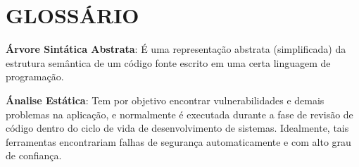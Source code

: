 



\chapter*{GLOSSÁRIO}

{ \setlength{\parindent}{0pt} %

\textbf{Árvore Sintática Abstrata}: É uma representação abstrata (simplificada) da estrutura semântica de um código fonte escrito em uma certa linguagem de programação.

\textbf{Ánalise Estática}: Tem por objetivo encontrar vulnerabilidades e demais problemas na aplicação, e normalmente é executada durante a fase de revisão de código dentro do ciclo de vida de desenvolvimento de sistemas. Idealmente, tais ferramentas encontrariam falhas de segurança automaticamente e com alto grau de confiança.

} %
